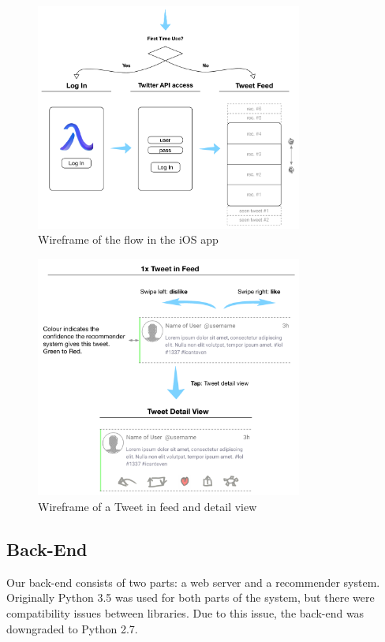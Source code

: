 \documentclass{article}
\begin{document}
\begin{figure}[H]
    \centering
    \includegraphics[width=0.78\textwidth]{ios_wireframe_1}  
    \caption{Wireframe of the flow in the iOS app}
\end{figure}

\begin{figure}[H]
    \centering
    \includegraphics[width=0.78\textwidth]{ios_wireframe_2}  
    \caption{Wireframe of a Tweet in feed and detail view}
\end{figure}

\subsection{Back-End}
Our back-end consists of two parts: a web server and a recommender system. Originally Python 3.5 was used for both parts of the system, but there were compatibility issues between libraries. Due to this issue, the back-end was downgraded to Python 2.7.
\end{document}
